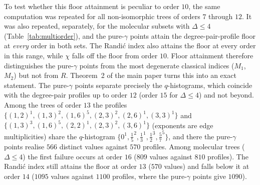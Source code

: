 \documentclass[a5paper, 10pt]{article}
\theoremstyle{plain}
\theoremstyle{remark}
\theoremstyle{definition}
\begin{document}
To test whether this floor attainment is peculiar to order $10$, the
same computation was repeated for all non-isomorphic trees of orders
$7$ through $12$. It was also repeated, separately, for the molecular
subsets with $\Delta \le 4$ (Table~\ref{tab:multiorder}), and the
pure-$\gamma$ points attain the degree-pair-profile floor at
\emph{every} order in both sets. The Randi\'c index also attains the
floor at every order in this range, while $\chi$ falls off the floor
from order $10$. Floor attainment therefore distinguishes the pure-$\gamma$ points from the most degenerate classical indices ($M_1$, $M_2$) but not from $R$.
Theorem~2 of the main paper turns this into an exact statement. The
pure-$\gamma$ points separate precisely the $q$-histograms, which
coincide with the degree-pair profiles up to order $12$ (order $15$ for
$\Delta \le 4$) and not beyond. Among the trees of order $13$ the
profiles
$\{(1,2)^{1}, (1,3)^{2}, (1,6)^{5}, (2,3)^{2}, (2,6)^{1}, (3,3)^{1}\}$
and $\{(1,3)^{3}, (1,6)^{5}, (2,2)^{1}, (2,3)^{2}, (3,6)^{1}\}$
(exponents are edge multiplicities) share the $q$-histogram
$\{0^{1}, \tfrac15^{2}, \tfrac13^{1}, \tfrac12^{3}, \tfrac57^{5}\}$,
and there the pure-$\gamma$ points realise $566$ distinct values against
$570$ profiles. Among molecular trees ($\Delta \le 4$) the first
failure occurs at order $16$ ($809$ values against $810$ profiles).
The Randi\'c index still attains the floor at order $13$ ($570$ values)
and falls below it at order $14$ ($1095$ values against $1100$
profiles, where the pure-$\gamma$ points give $1090$).
\end{document}
